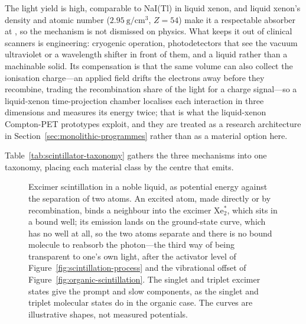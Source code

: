 The light yield is high, comparable to NaI(Tl) in liquid xenon, and liquid xenon's density and atomic number ($\qty{2.95}{\gram\per\centi\metre\cubed}$, $Z=54$) make it a respectable absorber at , so the mechanism is not dismissed on physics.
What keeps it out of clinical scanners is engineering: cryogenic operation, photodetectors that see the vacuum ultraviolet or a wavelength shifter in front of them, and a liquid rather than a machinable solid.
Its compensation is that the same volume can also collect the ionisation charge---an applied field drifts the electrons away before they recombine, trading the recombination share of the light for a charge signal---so a liquid-xenon time-projection chamber localises each interaction in three dimensions and measures its energy twice; that is what the liquid-xenon Compton-PET prototypes exploit, and they are treated as a research architecture in Section~\ref{sec:monolithic-programmes} rather than as a material option here.

Table~\ref{tab:scintillator-taxonomy} gathers the three mechanisms into one taxonomy, placing each material class by the centre that emits.

\begin{figure}[p] %
	\centering
	
	\caption[Noble-element excimer scintillation]{%
		Excimer scintillation in a noble liquid, as potential energy against the separation of two atoms.
		An excited atom, made directly or by recombination, binds a neighbour into the excimer Xe$_2^*$, which sits in a bound well; its emission lands on the ground-state curve, which has no well at all, so the two atoms separate and there is no bound molecule to reabsorb the photon---the third way of being transparent to one's own light, after the activator level of Figure~\ref{fig:scintillation-process} and the vibrational offset of Figure~\ref{fig:organic-scintillation}.
		The singlet and triplet excimer states give the prompt and slow components, as the singlet and triplet molecular states do in the organic case.
		The curves are illustrative shapes, not measured potentials.
	}
	\label{fig:excimer-scintillation}
\end{figure}

\clearpage

